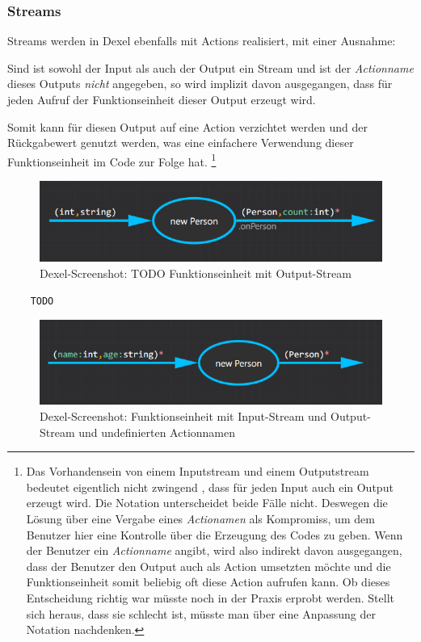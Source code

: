 	 \subsubsection{Streams}

	Streams werden in Dexel ebenfalls mit Actions realisiert, mit einer Ausnahme:
	
	Sind ist sowohl der Input als auch der Output ein Stream und ist der \textit{Actionname} dieses Outputs \textit{nicht} angegeben, so wird  implizit davon ausgegangen, dass für jeden Aufruf der Funktionseinheit dieser Output erzeugt wird. 
	
	Somit kann für diesen Output auf eine Action verzichtet werden und der Rückgabewert genutzt werden, was eine einfachere Verwendung dieser Funktionseinheit im Code zur Folge hat.
	\footnote{	Das Vorhandensein von einem Inputstream und einem Outputstream bedeutet eigentlich nicht zwingend , dass für jeden Input auch ein	Output erzeugt wird. Die Notation unterscheidet beide Fälle nicht. Deswegen die Lösung über eine Vergabe eines \textit{Actionamen} als Kompromiss, um dem Benutzer hier eine Kontrolle über die Erzeugung des Codes zu geben. Wenn der Benutzer ein \textit{Actionname} angibt, wird also indirekt davon ausgegangen, dass der Benutzer den Output auch als Action umsetzten möchte und die Funktionseinheit somit beliebig oft diese Action aufrufen kann. Ob dieses Entscheidung richtig war müsste  noch in der Praxis erprobt werden. Stellt sich heraus,	dass sie schlecht ist, müsste man über eine Anpassung der Notation nachdenken.}
	
		
		\begin{figure}[!htbp]
			\centering
			\includegraphics[width=.9\linewidth]{./img/roslyn_Stream.png} 
			\caption{Dexel-Screenshot: TODO Funktionseinheit mit Output-Stream}
		\end{figure}
		
	

	
	
	\begin{verbatim}
	TODO
	\end{verbatim}
	
			
			\begin{figure}[!htbp]
				\centering
				\includegraphics[width=.9\linewidth]{./img/roslyn_StreamStream.png} 
				\caption{Dexel-Screenshot: Funktionseinheit mit Input-Stream und Output-Stream und undefinierten Actionnamen}
			\end{figure}
			

